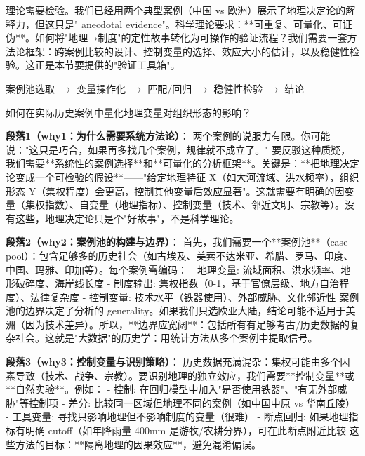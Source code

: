 \documentclass[openany, a4paper, 12pt]{book}
\newenvironment{logicmap}{
	\begin{tcolorbox}[
		colback=blue!5!white,      %
		colframe=blue!50!black,    %
		title=\textbf{逻辑地图 (Logic Map)}, %
		fonttitle=\bfseries,
		sharp corners=south,       %
		boxrule=0.5mm
		]
	\centering
	}{
	\end{tcolorbox}
}
\newenvironment{motivation}{
	\vspace{0.5em}
	\begin{tcolorbox}[
		colback=gray!10,           %
		colframe=gray!60,          %
		title=\textit{本章动机 (Motivation)},
		fonttitle=\bfseries,
		arc=0mm,                   %
		leftrule=3mm               %
		]
		\small \itshape %
	}{
	\end{tcolorbox}
	\vspace{1em}
}
\begin{document}
\begin{motivation}
	理论需要检验。我们已经用两个典型案例（中国 vs 欧洲）展示了地理决定论的解释力，但这只是" anecdotal evidence"。科学理论要求：**可重复、可量化、可证伪**。如何将"地理→制度"的定性故事转化为可操作的验证流程？我们需要一套方法论框架：跨案例比较的设计、控制变量的选择、效应大小的估计，以及稳健性检验。这正是本节要提供的"验证工具箱"。
\end{motivation}

\begin{logicmap}
	案例池选取 $\rightarrow$ 变量操作化 $\rightarrow$ 匹配/回归 $\rightarrow$ 稳健性检验 $\rightarrow$ 结论
\end{logicmap}

\begin{questionbox}
	如何在实际历史案例中量化地理变量对组织形态的影响？
\end{questionbox}

	
	\textbf{段落1（why1：为什么需要系统方法论）}：  
两个案例的说服力有限。你可能说："这只是巧合，如果再多找几个案例，规律就不成立了。" 要反驳这种质疑，我们需要**系统性的案例选择**和**可量化的分析框架**。关键是：**把地理决定论变成一个可检验的假设**——"给定地理特征 X（如大河流域、洪水频率），组织形态 Y（集权程度）会更高，控制其他变量后效应显著"。这就需要有明确的因变量（集权指数）、自变量（地理指标）、控制变量（技术、邻近文明、宗教等）。没有这些，地理决定论只是个"好故事"，不是科学理论。

\textbf{段落2（why2：案例池的构建与边界）}：  
首先，我们需要一个**案例池**（case pool）：包含足够多的历史社会（如古埃及、美索不达米亚、希腊、罗马、印度、中国、玛雅、印加等）。每个案例需编码：
- 地理变量: 流域面积、洪水频率、地形破碎度、海岸线长度
- 制度输出: 集权指数（0-1，基于官僚层级、地方自治程度）、法律复杂度
- 控制变量: 技术水平（铁器使用）、外部威胁、文化邻近性
案例池的边界决定了分析的 generality。如果我们只选欧亚大陆，结论可能不适用于美洲（因为技术差异）。所以，**边界应宽阔**：包括所有有足够考古/历史数据的复杂社会。这就是"大数据"的历史学：用统计方法从多个案例中提取信号。

\textbf{段落3（why3：控制变量与识别策略）}：  
历史数据充满混杂：集权可能由多个因素导致（技术、战争、宗教）。要识别地理的独立效应，我们需要**控制变量**或**自然实验**。例如：
- 控制: 在回归模型中加入"是否使用铁器"、"有无外部威胁"等控制项
- 差分: 比较同一区域但地理不同的案例（如中国中原 vs 华南丘陵）
- 工具变量: 寻找只影响地理但不影响制度的变量（很难）
- 断点回归: 如果地理指标有明确 cutoff（如年降雨量 400mm 是游牧/农耕分界），可在此断点附近比较
这些方法的目标：**隔离地理的因果效应**，避免混淆偏误。
\end{document}
